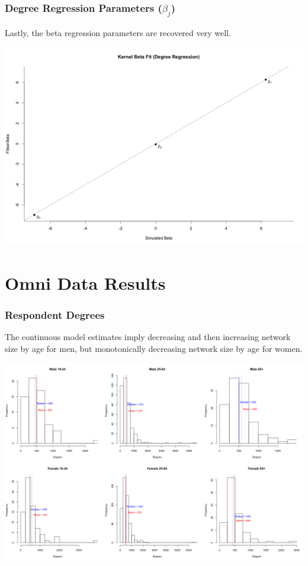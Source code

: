 \documentclass[12pt]{article}
\begin{document}
\subsubsection*{Degree Regression Parameters ($\beta_j$)}
\noindent Lastly, the beta regression parameters are recovered very well.

\begin{center}
\includegraphics[scale = 0.34]{fig/fit_beta_reg.png}
\end{center}

\pagebreak
\section{Omni Data Results}
\subsubsection*{Respondent Degrees}
The continuous model estimates imply decreasing and then increasing network size by age for men, but monotonically decreasing network size by age for women.

\begin{center}
\includegraphics[scale = 0.36]{fig/deg_name_sexage.png}
\end{center}
\end{document}
